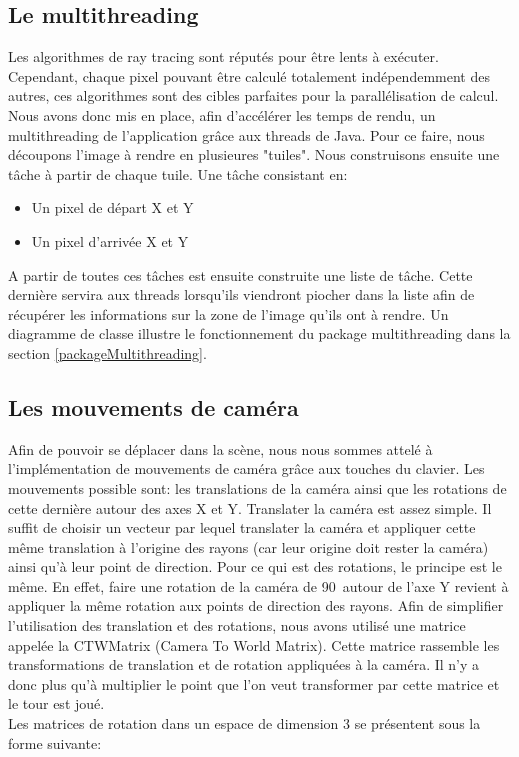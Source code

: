 \documentclass[11pt]{article}
\begin{document}
\subsection{Le multithreading}
\label{multithreading}
Les algorithmes de ray tracing sont réputés pour être lents à exécuter. Cependant, chaque pixel pouvant être calculé totalement indépendemment des autres, ces algorithmes sont des cibles parfaites pour la parallélisation de calcul. Nous avons donc mis en place, afin d'accélérer les temps de rendu, un multithreading de l'application grâce aux threads de Java. Pour ce faire, nous découpons l'image à rendre en plusieures "tuiles". Nous construisons ensuite une tâche à partir de chaque tuile. Une tâche consistant en:
\begin{itemize}
	\item{Un pixel de départ X et Y}	
	\item{Un pixel d'arrivée X et Y}
\end{itemize}
A partir de toutes ces tâches est ensuite construite une liste de tâche. Cette dernière servira aux threads lorsqu'ils viendront piocher dans la liste afin de récupérer les informations sur la zone de l'image qu'ils ont à rendre.
Un diagramme de classe illustre le fonctionnement du package multithreading dans la section \ref{packageMultithreading}.

\subsection{Les mouvements de caméra}
\label{mouvementsCamera}

Afin de pouvoir se déplacer dans la scène, nous nous sommes attelé à l'implémentation de mouvements de caméra grâce aux touches du clavier. Les mouvements possible sont: les translations de la caméra ainsi que les rotations de cette dernière autour des axes X et Y. Translater la caméra est assez simple. Il suffit de choisir un vecteur par lequel translater la caméra et appliquer cette même translation à l'origine des rayons (car leur origine doit rester la caméra) ainsi qu'à leur point de direction. Pour ce qui est des rotations, le principe est le même. En effet, faire une rotation de la caméra de 90\degree\ autour de l'axe Y revient à appliquer la même rotation aux points de direction des rayons. Afin de simplifier l'utilisation des translation et des rotations, nous avons utilisé une matrice appelée la CTWMatrix (Camera To World Matrix). Cette matrice rassemble les transformations de translation et de rotation appliquées à la caméra. Il n'y a donc plus qu'à multiplier le point que l'on veut transformer par cette matrice et le tour est joué.\\
Les matrices de rotation dans un espace de dimension 3 se présentent sous la forme suivante:
\end{document}
